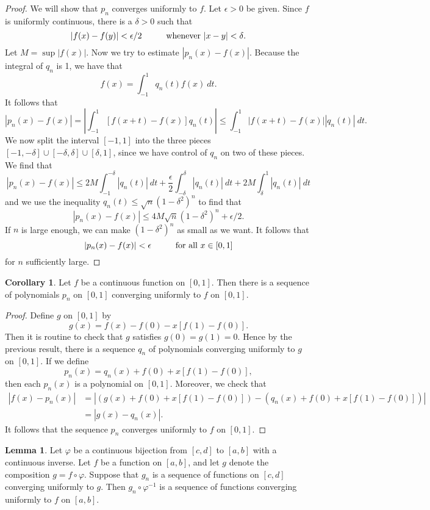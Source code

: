 \documentclass[12pt]{article}
\theoremstyle{definition}
\theoremstyle{theorem}
\newtheorem{corollary}[definition]{Corollary}
\newtheorem{lemma}[definition]{Lemma}
\begin{document}
\begin{proof}
We will show that $p_n$ converges uniformly to $f$. Let $\epsilon > 0$ be given. Since $f$ is uniformly continuous, there is a $\delta > 0$ such that 
\[
|f(x) - f(y)| < \epsilon/2 \hspace{10mm} \text{whenever $|x-y| < \delta$}.
\]
Let $M = \sup |f(x)|$. Now we try to estimate $|p_n(x) - f(x)|$. Because the integral of $q_n$ is 1, we have that 
\[
f(x) = \int_{-1}^1 q_n(t) f(x) \: dt.
\]
It follows that 
\[
|p_n(x) - f(x)| = \left|\int_{-1}^1 [f(x + t) - f(x)]q_n(t)\right| \leqslant \int_{-1}^1 |f(x+t) - f(x)| |q_n(t)| \: dt.
\]
We now split the interval $[-1,1]$ into the three pieces $[-1,-\delta] \cup [-\delta, \delta] \cup [\delta, 1]$, since we have control of $q_n$ on two of these pieces. We find that 
\[
|p_n(x) - f(x)| \leqslant 2M \int_{-1}^{-\delta} |q_n(t)| \:dt + \frac{\epsilon}{2} \int_{-\delta}^\delta |q_n(t)| \: dt + 2M \int_{\delta}^1 |q_n(t)|\: dt
\]
and we use the inequality $q_n(t) \leqslant \sqrt{n}(1 - \delta^2)^n$ to find that 
\[
|p_n(x) - f(x)| \leqslant 4M \sqrt{n}(1 - \delta^2)^n + \epsilon/2.
\]
If $n$ is large enough, we can make $(1-\delta^2)^n$ as small as we want. It follows that 
\[
|p_n(x) - f(x)| < \epsilon \hspace{10mm} \text{for all $x \in [0,1]$}
\]
for $n$ sufficiently large. 
\end{proof}


\begin{corollary}
Let $f$ be a continuous function on $[0,1]$. Then there is a sequence of polynomials $p_n$ on $[0,1]$ converging uniformly to $f$ on $[0,1]$. 
\end{corollary}

\begin{proof}
Define $g$ on $[0,1]$ by 
\[
g(x) = f(x) - f(0) - x[f(1) - f(0)].
\]
Then it is routine to check that $g$ satisfies $g(0) = g(1) = 0$. Hence by the previous result, there is a sequence $q_n$ of polynomials converging uniformly to $g$ on $[0,1]$. If we define 
\[
p_n(x) = q_n(x) + f(0) + x[f(1) - f(0)],
\]
then each $p_n(x)$ is a polynomial on $[0,1]$. Moreover, we check that 
\begin{align*}
|f(x) - p_n(x)| &= |(g(x) + f(0) + x[f(1) - f(0)]) - (q_n(x) + f(0) + x[f(1) - f(0)]) |\\
&= |g(x) - q_n(x)|.
\end{align*}
It follows that the sequence $p_n$ converges uniformly to $f$ on $[0,1]$.
\end{proof}

\begin{lemma}
Let $\varphi$ be a continuous bijection from $[c,d]$ to $[a,b]$ with a continuous inverse. Let $f$ be a function on $[a,b]$, and let $g$ denote the composition $g = f \circ \varphi$. Suppose that $g_n$ is a sequence of functions on $[c,d]$ converging uniformly to $g$. Then $g_n \circ \varphi^{-1}$ is a sequence of functions converging uniformly to $f$ on $[a,b]$. 
\end{lemma}
\end{document}
